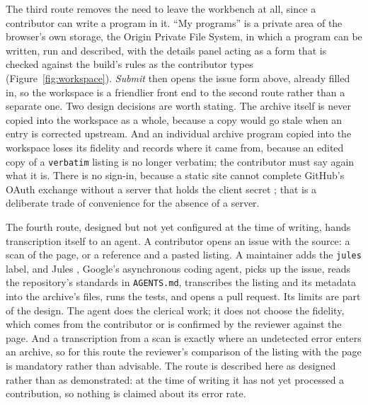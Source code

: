 The third route removes the need to leave the workbench at all, since a contributor can write a program in it. ``My programs'' is a private area of the browser's own storage, the Origin Private File System, in which a program can be written, run and described, with the details panel acting as a form that is checked against the build's rules as the contributor types (Figure~\ref{fig:workspace}). \emph{Submit} then opens the issue form above, already filled in, so the workspace is a friendlier front end to the second route rather than a separate one. Two design decisions are worth stating. The archive itself is never copied into the workspace as a whole, because a copy would go stale when an entry is corrected upstream. And an individual archive program copied into the workspace loses its fidelity and records where it came from, because an edited copy of a \texttt{verbatim} listing is no longer verbatim; the contributor must say again what it is. There is no sign-in, because a static site cannot complete GitHub's OAuth exchange without a server that holds the client secret \citep{githubOAuth}; that is a deliberate trade of convenience for the absence of a server.

The fourth route, designed but not yet configured at the time of writing, hands transcription itself to an agent. A contributor opens an issue with the source: a scan of the page, or a reference and a pasted listing. A maintainer adds the \texttt{jules} label, and Jules \citep{jules}, Google's asynchronous coding agent, picks up the issue, reads the repository's standards in \texttt{AGENTS.md}, transcribes the listing and its metadata into the archive's files, runs the tests, and opens a pull request. Its limits are part of the design. The agent does the clerical work; it does not choose the fidelity, which comes from the contributor or is confirmed by the reviewer against the page. And a transcription from a scan is exactly where an undetected error enters an archive, so for this route the reviewer's comparison of the listing with the page is mandatory rather than advisable. The route is described here as designed rather than as demonstrated: at the time of writing it has not yet processed a contribution, so nothing is claimed about its error rate.

